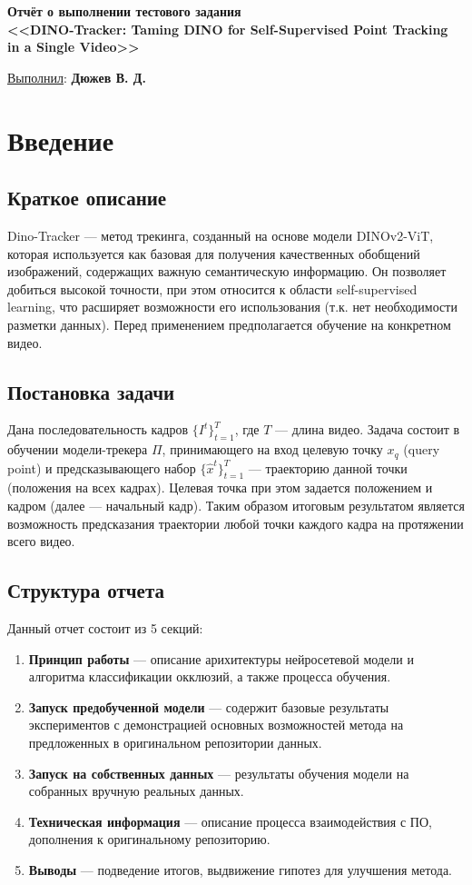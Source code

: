 \documentclass[a4paper, 14pt]{extarticle}
\theoremstyle{definition}
\theoremstyle{plain}
\theoremstyle{remark}
\newcommand*{\titlePage}{
	\thispagestyle{title}
	\begingroup
	\begin{center}
		\vspace*{3ex}
		{\small
		}
		
		\vspace*{2ex}
		
		{\normalsize
		}
		
		\vspace*{30ex}
		
		{\Large \bfseries 
			Отчёт о выполнении тестового задания\\
			{\large <<DINO-Tracker: Taming DINO for Self-Supervised
			Point Tracking in a Single Video>>\\
				}
			
		}
		
	\end{center}
	\vspace*{10ex}
	\begin{flushright}
		{\large 
			\underline{Выполнил}: \textbf{Дюжев В. Д.}
		}

	\end{flushright}	
	\newpage
	\setcounter{page}{1}
	\endgroup}
\begin{document}
\renewcommand{\contentsname}{\hfillОГЛАВЛЕНИЕ\hfill} 
\titlePage
\thispagestyle{plain}
\tableofcontents
\pagestyle{style}

\newpage
\setcounter{page}{1}


\section{Введение}
\subsection{Краткое описание}
Dino-Tracker --- метод трекинга, созданный на основе модели DINOv2-ViT, которая используется как базовая для получения качественных обобщений изображений, содержащих важную семантическую информацию. Он позволяет добиться высокой точности, при этом относится к области self-supervised learning, что расширяет возможности его использования (т.к. нет необходимости разметки данных). Перед применением предполагается обучение на конкретном видео.

\subsection{Постановка задачи}
Дана последовательность кадров $\{I^t\}^T_{t=1}$, где $T$ --- длина видео. Задача состоит в обучении модели-трекера $\Pi$, принимающего на вход целевую точку $x_q$ (query point) и предсказывающего набор $\{\hat{x}^t\}^T_{t=1}$ --- траекторию данной точки (положения на всех кадрах). Целевая точка при этом задается положением и кадром (далее --- начальный кадр).
Таким образом итоговым результатом является возможность предсказания траектории любой точки каждого кадра на протяжении всего видео.

\subsection{Структура отчета}
Данный отчет состоит из 5 секций:
\begin{enumerate}
	\item \textbf{Принцип работы} --- описание арихитектуры нейросетевой модели и алгоритма классификации окклюзий, а также процесса обучения.
	\item \textbf{Запуск предобученной модели} --- содержит базовые результаты экспериментов с демонстрацией основных возможностей метода на предложенных в оригинальном репозитории данных.
	\item \textbf{Запуск на собственных данных} --- результаты обучения модели на собранных вручную реальных данных.
	\item \textbf{Техническая информация} --- описание процесса взаимодействия с ПО, дополнения к оригинальному репозиторию.
	\item \textbf{Выводы} --- подведение итогов, выдвижение гипотез для улучшения метода.
\end{enumerate}
\end{document}

